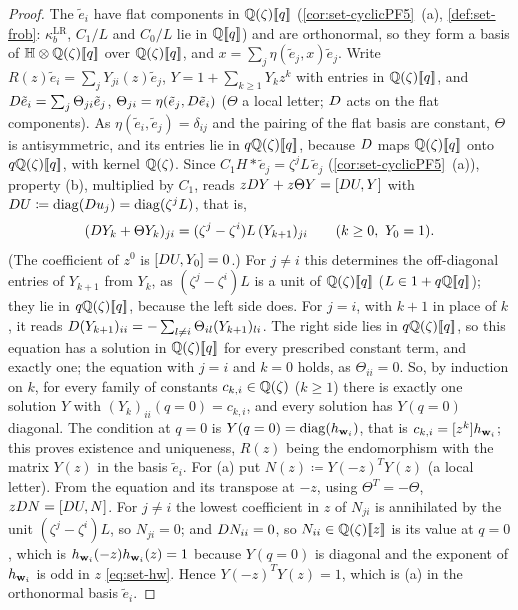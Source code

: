 \begin{proof}
The $\tilde e_i$ have flat components in $\mathbb{Q}(\zeta)[\![ q ]\!]$ (\cref{cor:set-cyclicPF5}~(a), \cref{def:set-frob}: $\kappa^{\mathrm{LR}}_b$, $C_1/L$ and $C_0/L$ lie in $\mathbb{Q}[\![ q ]\!]$) and are orthonormal, so they form a basis of $\mathbb{H}\otimes\mathbb{Q}(\zeta)[\![ q ]\!]$ over $\mathbb{Q}(\zeta)[\![ q ]\!]$, and $x=\sum_j\eta(\tilde e_j,x)\tilde e_j$. Write $R(z)\tilde e_i=\sum_jY_{ji}(z)\tilde e_j$, $Y=1+\sum_{k\geq1}Y_kz^k$ with entries in $\mathbb{Q}(\zeta)[\![ q ]\!]$, and $D\tilde e_i=\sum_j\Theta_{ji}\tilde e_j$, $\Theta_{ji}=\eta(\tilde e_j,D\tilde e_i)$ ($\Theta$ a local letter; $D$ acts on the flat components). As $\eta(\tilde e_i,\tilde e_j)=\delta_{ij}$ and the pairing of the flat basis are constant, $\Theta$ is antisymmetric, and its entries lie in $q\mathbb{Q}(\zeta)[\![ q ]\!]$, because $D$ maps $\mathbb{Q}(\zeta)[\![ q ]\!]$ onto $q\mathbb{Q}(\zeta)[\![ q ]\!]$, with kernel $\mathbb{Q}(\zeta)$. Since $C_1H*\tilde e_j=\zeta^jL\,\tilde e_j$ (\cref{cor:set-cyclicPF5}~(a)), property (b), multiplied by $C_1$, reads $zD Y+z\Theta Y=[D U,Y]$ with $D U\coloneqq\operatorname{diag}(D u_j)=\operatorname{diag}(\zeta^jL)$, that is,
\[
(\Dq Y_k+\Theta Y_k)_{ji}=(\zeta^j-\zeta^i)L\,(Y_{k+1})_{ji}\qquad(k\geq0,\ Y_0=1).
\]
(The coefficient of $z^0$ is $[D U,Y_0]=0$.) For $j\neq i$ this determines the off-diagonal entries of $Y_{k+1}$ from $Y_k$, as $(\zeta^j-\zeta^i)L$ is a unit of $\mathbb{Q}(\zeta)[\![ q ]\!]$ ($L\in1+q\mathbb{Q}[\![ q ]\!]$); they lie in $q\mathbb{Q}(\zeta)[\![ q ]\!]$, because the left side does. For $j=i$, with $k+1$ in place of $k$, it reads $D(Y_{k+1})_{ii}=-\sum_{l\neq i}\Theta_{il}(Y_{k+1})_{li}$. The right side lies in $q\mathbb{Q}(\zeta)[\![ q ]\!]$, so this equation has a solution in $\mathbb{Q}(\zeta)[\![ q ]\!]$ for every prescribed constant term, and exactly one; the equation with $j=i$ and $k=0$ holds, as $\Theta_{ii}=0$. So, by induction on $k$, for every family of constants $c_{k,i}\in\mathbb{Q}(\zeta)$ ($k\geq1$) there is exactly one solution $Y$ with $(Y_k)_{ii}(q=0)=c_{k,i}$, and every solution has $Y(q=0)$ diagonal. The condition at $q=0$ is $Y(q=0)=\operatorname{diag}(h_{\mathbf{w}_i})$, that is $c_{k,i}=[z^k]h_{\mathbf{w}_i}$; this proves existence and uniqueness, $R(z)$ being the endomorphism with the matrix $Y(z)$ in the basis $\tilde e_i$. For (a) put $N(z)\coloneqq Y(-z)^TY(z)$ (a local letter). From the equation and its transpose at $-z$, using $\Theta^T=-\Theta$, $zD N=[D U,N]$. For $j\neq i$ the lowest coefficient in $z$ of $N_{ji}$ is annihilated by the unit $(\zeta^j-\zeta^i)L$, so $N_{ji}=0$; and $D N_{ii}=0$, so $N_{ii}\in\mathbb{Q}(\zeta)[\![ z ]\!]$ is its value at $q=0$, which is $h_{\mathbf{w}_i}(-z)h_{\mathbf{w}_i}(z)=1$ because $Y(q=0)$ is diagonal and the exponent of $h_{\mathbf{w}_i}$ is odd in $z$ \eqref{eq:set-hw}. Hence $Y(-z)^TY(z)=1$, which is (a) in the orthonormal basis $\tilde e_i$.
\end{proof}

